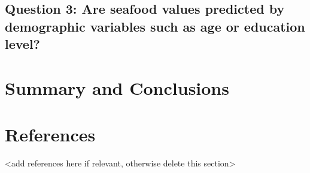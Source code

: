 \documentclass[
  12pt,
]{article}
\begin{document}
\hypertarget{question-3-are-seafood-values-predicted-by-demographic-variables-such-as-age-or-education-level}{%
\subsection{Question 3: Are seafood values predicted by demographic
variables such as age or education
level?}\label{question-3-are-seafood-values-predicted-by-demographic-variables-such-as-age-or-education-level}}

\newpage

\hypertarget{summary-and-conclusions}{%
\section{Summary and Conclusions}\label{summary-and-conclusions}}

\newpage

\hypertarget{references}{%
\section{References}\label{references}}

\textless add references here if relevant, otherwise delete this
section\textgreater{}
\end{document}
